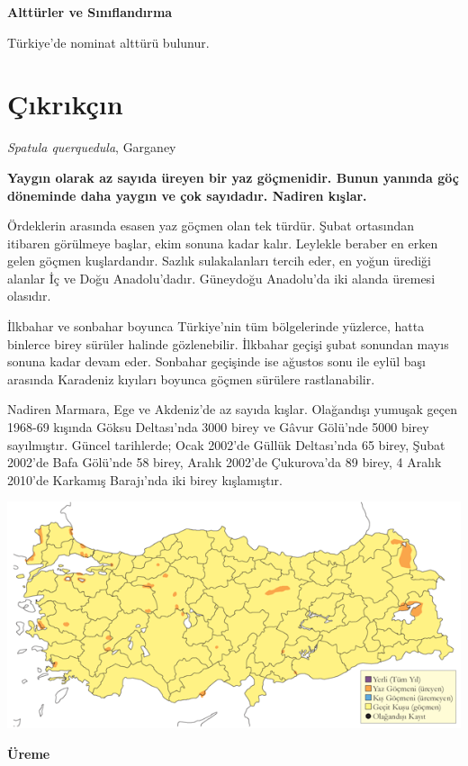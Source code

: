 \documentclass[
  letterpaper,
  DIV=11,
  numbers=noendperiod]{scrreprt}
\begin{document}
\textbf{Alttürler ve Sınıflandırma}

Türkiye'de nominat alttürü bulunur.

\section{Çıkrıkçın}\label{uxe7ux131krux131kuxe7ux131n}

\emph{Spatula querquedula}, Garganey

\textbf{Yaygın olarak az sayıda üreyen bir yaz göçmenidir. Bunun yanında
göç döneminde daha yaygın ve çok sayıdadır. Nadiren kışlar.}

Ördeklerin arasında esasen yaz göçmen olan tek türdür. Şubat ortasından
itibaren görülmeye başlar, ekim sonuna kadar kalır. Leylekle beraber en
erken gelen göçmen kuşlardandır. Sazlık sulakalanları tercih eder, en
yoğun ürediği alanlar İç ve Doğu Anadolu'dadır. Güneydoğu Anadolu'da iki
alanda üremesi olasıdır.

İlkbahar ve sonbahar boyunca Türkiye'nin tüm bölgelerinde yüzlerce,
hatta binlerce birey sürüler halinde gözlenebilir. İlkbahar geçişi şubat
sonundan mayıs sonuna kadar devam eder. Sonbahar geçişinde ise ağustos
sonu ile eylül başı arasında Karadeniz kıyıları boyunca göçmen sürülere
rastlanabilir.

Nadiren Marmara, Ege ve Akdeniz'de az sayıda kışlar. Olağandışı yumuşak
geçen 1968-69 kışında Göksu Deltası'nda 3000 birey ve Gâvur Gölü'nde
5000 birey sayılmıştır. Güncel tarihlerde; Ocak 2002'de Güllük
Deltası'nda 65 birey, Şubat 2002'de Bafa Gölü'nde 58 birey, Aralık
2002'de Çukurova'da 89 birey, 4 Aralık 2010'de Karkamış Barajı'nda iki
birey kışlamıştır.

\includegraphics{images/harita_Page_019.png}

\textbf{Üreme}
\end{document}

